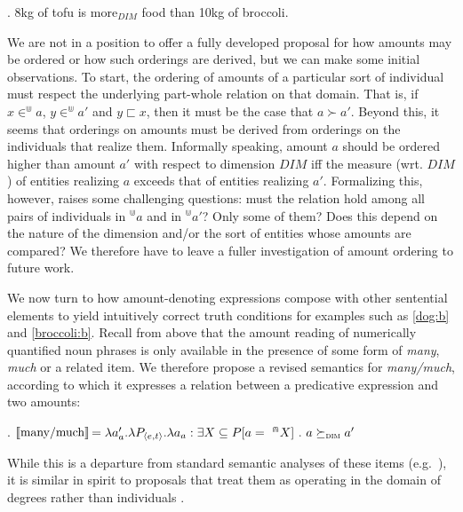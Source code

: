 \documentclass[a4paper,12pt,twoside]{article}
\newcommand{\sv}[1]{\ensuremath{\llbracket\textnormal{#1}\rrbracket}}
\begin{document}
	\ex. 8kg of tofu is more$_{DIM}$ food than 10kg of broccoli.
	
	We are not in a position to offer a fully developed proposal for how amounts may be ordered or how such orderings are derived, but we can make some initial observations. To start, the ordering of amounts of a particular sort of individual must respect the underlying part-whole relation on that domain. That is, if $x \in ^{\Cup}\!\! a$,  $y \in ^{\Cup} \!\!a'$ and  $y \sqsubset x$, then it must be the case that $a \succ a'$. Beyond this, it seems that orderings on amounts must be derived from orderings on the individuals that realize them.  Informally speaking, amount $a$ should be ordered higher than amount $a'$ with respect to dimension $DIM$ iff the measure (wrt. $DIM$) of  entities realizing $a$ exceeds  that of  entities realizing $a'$. Formalizing this, however, raises some challenging questions: must the relation hold among all pairs of individuals in $^{\Cup}\! a$ and in $^{\Cup}\! a'$? Only some of them?  Does this depend on the nature of the dimension and/or the sort of entities whose amounts are compared? We therefore have to leave a fuller investigation of amount ordering to future work.
	
	
	
	
	We now turn to how amount-denoting expressions  compose with other sentential elements to yield intuitively correct truth conditions for examples such as \ref{dog:b} and \ref{broccoli:b}. Recall from above that the amount reading of numerically quantified noun phrases is only available in the presence of some form of \textit{many}, \textit{much} or a related item. We therefore  propose a revised semantics for \textit{many/much}, according to which it expresses a relation between a predicative expression and two amounts:
	
	\ex.\label{much:basic} \sv{many/much}$=\lambda a_a' . \lambda P_{\langle e,t\rangle} . \lambda a_{a} : \exists X \subseteq P[a = \ ^{\Cap}X] \ . \ a \succeq_{\textsc{dim}} a'$
	
	While this is a departure from standard semantic analyses of these items (e.g.\ \citealt{Hackl:2000}), it is similar in spirit to proposals that treat them as operating in the domain of degrees rather than individuals \citep{Rett:2008,Solt:2015}.
	
\end{document}

